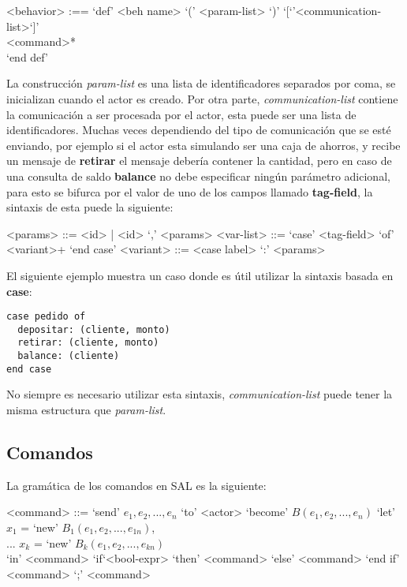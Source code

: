 \documentclass[fleqn]{article}
\begin{document}
\begin{grammar}
  <behavior> :== `def' <beh name> `(' <param-list> `)' `[`'<communication-list>`]' \\
            <command>* \\
  `end def'
\end{grammar}

La construcción \textit{param-list} es una lista de identificadores separados por coma,
se inicializan cuando el actor es creado. Por otra parte,
\textit{communication-list} contiene la comunicación a ser procesada por el
actor, esta puede ser una lista de identificadores.
Muchas veces dependiendo del tipo de comunicación que se esté enviando,
por ejemplo si el actor esta simulando ser una caja de ahorros, y recibe
un mensaje de \textbf{retirar} el mensaje debería contener la cantidad, pero en
caso de una consulta de saldo \textbf{balance} no debe especificar ningún parámetro
adicional, para esto se bifurca por el valor de uno de los campos llamado
\textbf{tag-field}, la sintaxis de esta puede  la siguiente:

\begin{grammar}
  <params> ::= <id> | <id> `,' <params>
  <var-list> ::= `case' <tag-field> `of' <variant>+ `end case'
  <variant> ::= <case label> `:' <params>
\end{grammar}

El siguiente ejemplo muestra un caso donde es útil utilizar la sintaxis basada
en \textbf{case}:

\begin{lstlisting}[language=sal, style=simple]
case pedido of 
  depositar: (cliente, monto) 
  retirar: (cliente, monto) 
  balance: (cliente) 
end case
\end{lstlisting}

No siempre es necesario utilizar esta sintaxis, \textit{communication-list} puede tener
la misma estructura que \textit{param-list}.

\subsection{Comandos}
La gramática de los comandos en SAL es la siguiente:

\begin{grammar}
  <command> ::= `send' $e_1, e_2, ..., e_n$ `to' <actor>  
  \alt `become' $B(e_1, e_2, ..., e_n)$
  \alt `let' $x_1$ = `new' $B_1(e_1, e_2, ..., e_{1n})$, \\
  ... $x_k$ = `new' $B_k(e_1, e_2, ..., e_{kn})$        \\
  `in' <command> 
  \alt `if`<bool-expr> `then' <command> `else' <command> `end if' 
  \alt <command> `;' <command>
\end{grammar}
\end{document}

